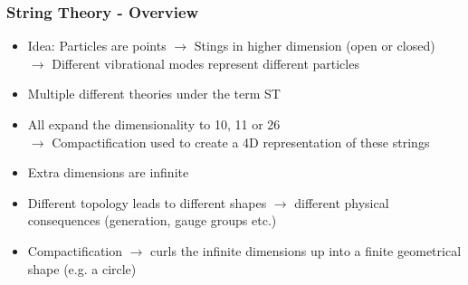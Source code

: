 \documentclass[aspectratio=1610, 9pt]{beamer}
\begin{document}
\begin{frame}
	\frametitle{String Theory - Overview}
		\begin{itemize}
			\item Idea: Particles are points $\rightarrow$ Stings in higher dimension (open or closed)\\
			$\rightarrow$ Different vibrational modes represent different particles
			\item Multiple different theories under the term ST
			\item All expand the dimensionality to 10, 11 or 26\\
			$\rightarrow$ Compactification used to create a 4D representation of these strings
			\item Extra dimensions are infinite
			\item Different topology leads to different shapes $\rightarrow$ different physical consequences (generation, gauge groups etc.)
			\item Compactification $\rightarrow$ curls the infinite dimensions up into a finite geometrical shape (e.g. a circle) %
			
		\end{itemize}
\end{frame}
\end{document}
